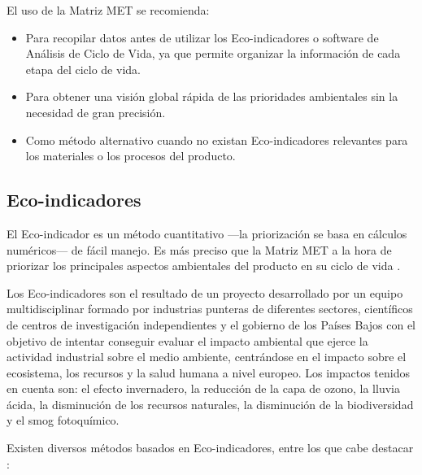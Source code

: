 El uso de la Matriz MET se recomienda:
\begin{itemize}
  \item Para recopilar datos antes de utilizar los Eco-indicadores o software de Análisis de Ciclo de Vida, ya que permite organizar la información de cada etapa del ciclo de vida.
  \item Para obtener una visión global rápida de las prioridades ambientales sin la necesidad de gran precisión.
  \item Como método alternativo cuando no existan Eco-indicadores relevantes para los materiales o los procesos del producto.
\end{itemize}

\subsection{Eco-indicadores}

El Eco-indicador es un método cuantitativo —la priorización se basa en cálculos numéricos— de fácil manejo. Es más preciso que la Matriz MET a la hora de priorizar los principales aspectos ambientales del producto en su ciclo de vida \cite{ihobeeco}.

Los Eco-indicadores son el resultado de un proyecto desarrollado por un equipo multidisciplinar formado por industrias punteras de diferentes sectores, científicos de centros de investigación independientes y el gobierno de los Países Bajos con el objetivo de intentar conseguir evaluar el impacto ambiental que ejerce la actividad industrial sobre el medio ambiente, centrándose en el impacto sobre el ecosistema, los recursos y la salud humana a nivel europeo. Los impactos tenidos en cuenta son: el efecto invernadero, la reducción de la capa de ozono, la lluvia ácida, la disminución de los recursos naturales, la disminución de la biodiversidad y el smog fotoquímico.

Existen diversos métodos basados en Eco-indicadores, entre los que cabe destacar \cite{mlgceballos}:

